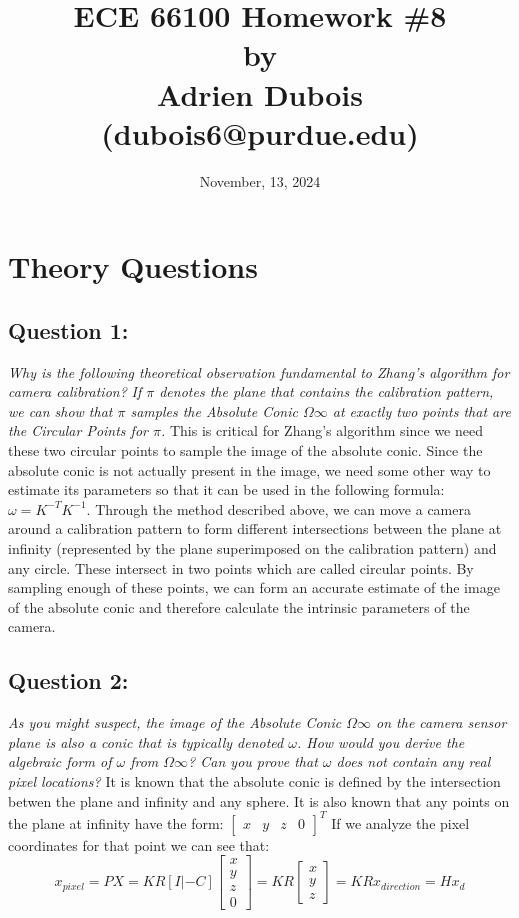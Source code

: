 \documentclass{article}
\author{}
\date{November, 13, 2024}
\title{\Large \textbf{ECE 66100 Homework \#8\\[0.1in] by\\ [0.1in] Adrien Dubois (dubois6@purdue.edu)}}
\begin{document}
\maketitle
\tableofcontents

\section{Theory Questions}
\subsection{Question 1:}
\textit{Why is the following theoretical observation fundamental to Zhang's algorithm for camera calibration?}
\textit{If $\pi$ denotes the plane that contains the calibration pattern, we can show that $\pi$ samples
the Absolute Conic $\Omega\infty$ at exactly two points that are the Circular Points for $\pi$.}
This is critical for Zhang's algorithm since we need these two circular points to sample the image of the absolute conic. Since the absolute conic is not actually present in the image, we need some other way to estimate its parameters so that it can be used in the following formula: \(\omega = K^{-T}K^{-1}\). Through the method described above, we can move a camera around a calibration pattern to form different intersections between the plane at infinity (represented by the plane superimposed on the calibration pattern) and any circle. These intersect in two points which are called circular points. By sampling enough of these points, we can form an accurate estimate of the image of the absolute conic and therefore calculate the intrinsic parameters of the camera.

\subsection{Question 2:}
\textit{As you might suspect, the image of the Absolute Conic $\Omega\infty$ on the camera sensor plane is also a
conic that is typically denoted $\omega$. How would you derive the algebraic form of $\omega$ from $\Omega\infty$? Can you prove that $\omega$ does not contain any real pixel locations?}
It is known that the absolute conic is defined by the intersection betwen the plane and infinity and any sphere. It is also known that any points on the plane at infinity have the form: \(\begin{bmatrix}
    x & y & z & 0
\end{bmatrix}^T\)
If we analyze the pixel coordinates for that point we can see that:
\[x_{pixel} = P X = KR\left[I | -C\right]\begin{bmatrix}
    x \\ y \\ z \\ 0
\end{bmatrix} = KR \begin{bmatrix}
    x \\ y \\ z
\end{bmatrix} = KR x_{direction} = H x_d\]
\end{document}
